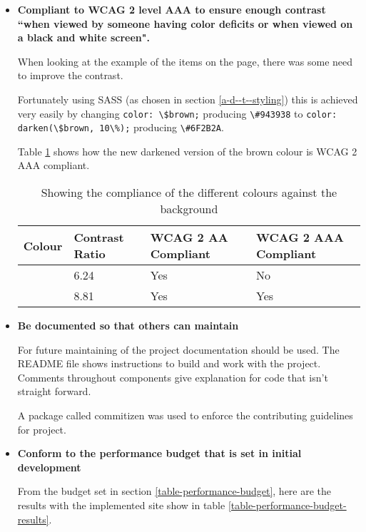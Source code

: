 \begin{itemize}
  \item \textbf{Compliant to WCAG 2 level AAA to ensure enough contrast ``when viewed by someone having color deficits or when viewed on a black and white screen". \cite{colour_contrast}}

    When looking at the example of the items on the page, there was some need to improve the contrast.

    Fortunately using SASS (as chosen in section \ref{a-d--t--styling}) this is achieved very easily by changing \verb|color: \$brown;| producing \verb|\#943938| to \verb|color: darken(\$brown, 10\%);| producing \verb|\#6F2B2A|.

    Table \ref{table-contrast-changes} shows how the new darkened version of the brown colour is WCAG 2 AAA compliant.

    \begin{table}[H]
    \centering
    \begin{tabular}{|l|l|l|l|}
    \hline
    \textbf{Colour} & \textbf{Contrast Ratio} & \textbf{WCAG 2 AA Compliant} & \textbf{WCAG 2 AAA Compliant} \\ \hline
    \cellcolor[HTML]{943938}{\color[HTML]{FFFFFF} \textbf{\#943938}} & 6.24 & Yes & No                       \\ \hline
    \cellcolor[HTML]{6F2B2A}{\color[HTML]{FFFFFF} \textbf{\#6F2B2A}} & 8.81 & Yes & Yes                      \\ \hline
    \end{tabular}
    \caption{Showing the compliance of the different colours against the background}
    \label{table-contrast-changes}
    \end{table}

  \item \textbf{Be documented so that others can maintain}

    For future maintaining of the project documentation should be used. The README file shows instructions to build and work with the project. Comments throughout components give explanation for code that isn't straight forward.

    A package called commitizen was used to enforce the contributing guidelines for project. \cite{commitizen}

  \item \textbf{Conform to the performance budget that is set in initial development}

    From the budget set in section \ref{table-performance-budget}, here are the results with the implemented site show in table \ref{table-performance-budget-results}.


\end{itemize}
